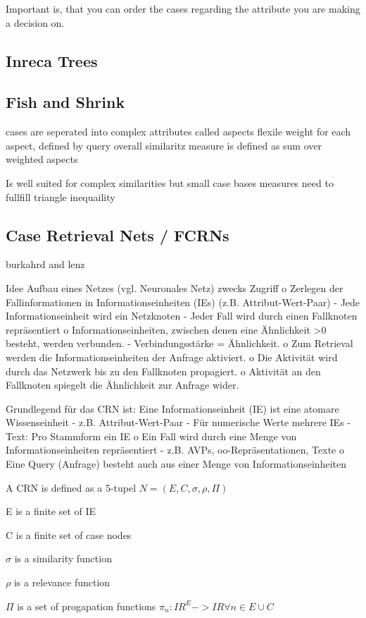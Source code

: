 \documentclass[10pt,oneside,a4paper]{scrartcl}
\begin{document}
Important is, that you can order the cases regarding the attribute you are making a decision on.


\cite{wess 95 althoff derwand}


\subsection{Inreca Trees}


\subsection{Fish and Shrink}


cases are seperated into complex attributes called aspects
flexile weight for each aspect, defined by query
overall similaritz measure is defined as sum over weighted aspects

Is well suited for complex similarities but small case bases
measures need to fullfill triangle inequaility

\cite{schaaf}



\subsection{Case Retrieval Nets / FCRNs}
burkahrd and lenz

Idee
Aufbau eines Netzes (vgl. Neuronales Netz) zwecks Zugriff
o Zerlegen der Fallinformationen in Informationseinheiten (IEs)
(z.B. Attribut-Wert-Paar)
- Jede Informationseinheit wird ein Netzknoten
- Jeder Fall wird durch einen Fallknoten repräsentiert
o Informationseinheiten, zwischen denen eine Ähnlichkeit >0 besteht,
werden verbunden.
- Verbindungsstärke = Ähnlichkeit.
o Zum Retrieval werden die Informationseinheiten der Anfrage aktiviert.
o Die Aktivität wird durch das Netzwerk bis zu den Fallknoten
propagiert.
o Aktivität an den Fallknoten spiegelt die Ähnlichkeit zur Anfrage wider.

Grundlegend für das CRN ist: Eine Informationseinheit
(IE) ist eine atomare Wissenseinheit
- z.B. Attribut-Wert-Paar
- Für numerische Werte mehrere IEs
- Text: Pro Stammform ein IE
o Ein Fall wird durch eine Menge von Informationseinheiten
repräsentiert
- z.B. AVPs, oo-Repräsentationen, Texte
o Eine Query (Anfrage) besteht auch aus einer Menge von
Informationseinheiten




A CRN is defined as a 5-tupel $N=(E,C,\sigma,\rho,\Pi)$
\item{E is a finite set of IE}
\item{C is a finite set of case nodes}
\item{$\sigma$ is a similarity function}
\item{$\rho$ is a relevance function}
\item{$\Pi$ is a set of progapation functions $\pi_n:IR^E->IR \forall n \in E \cup C$}
\end{document}
